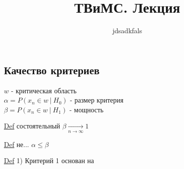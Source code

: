 \documentclass[a4paper]{article}
\begin{document}
\title{ТВиМС. Лекция}
\author{jdsadkfals}
\maketitle

\subsection*{Качество критериев}
$ w $ - критическая область\\
$ \alpha = P(x_n \in w \ | \ H_0) $ - размер критерия\\
$ \beta = P(x_n \in w \ | \ H_1) $ - мощность

\begin{tcolorbox}
    \underline{Def} состоятельный $ \beta \xrightarrow[n \to \infty]{} 1$ 
\end{tcolorbox}

\begin{tcolorbox}
    \underline{Def} не... $ \alpha \leq \beta $ 
\end{tcolorbox}

\begin{tcolorbox}
    \underline{Def} 1) Критерий 1 основан на 
\end{tcolorbox}
\end{document}
